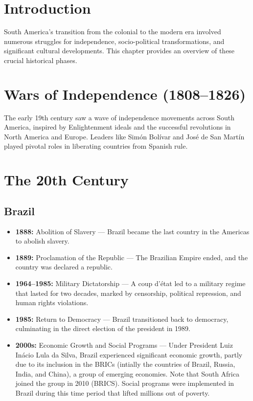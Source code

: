 \documentclass{book}
\begin{document}
\section{Introduction}
\label{sec:introduction-modern-south-america}
South America's transition from the colonial to the modern era involved numerous struggles for independence, socio-political transformations, and significant cultural developments. This chapter provides an overview of these crucial historical phases.

\section{Wars of Independence (1808–1826)}
\label{sec:wars-of-independence}
The early 19th century saw a wave of independence movements across South America, inspired by Enlightenment ideals and the successful revolutions in North America and Europe. Leaders like Simón Bolívar and José de San Martín played pivotal roles in liberating countries from Spanish rule.

\section{The 20th Century}
\label{sec:20th-century}

\subsection{Brazil}
\label{subsec:brazil}
\begin{itemize}
    \item \textbf{1888:} Abolition of Slavery — Brazil became the last country in the Americas to abolish slavery.
    \item \textbf{1889:} Proclamation of the Republic — The Brazilian Empire ended, and the country was declared a republic.
    \item \textbf{1964–1985:} Military Dictatorship — A coup d'état led to a military regime that lasted for two decades, marked by censorship, political repression, and human rights violations.
    \item \textbf{1985:} Return to Democracy — Brazil transitioned back to democracy, culminating in the direct election of the president in 1989.
    \item \textbf{2000s:} Economic Growth and Social Programs — Under President Luiz Inácio Lula da Silva, Brazil experienced significant economic growth, partly due to its inclusion in the BRICs (intially the countries of Brazil, Russia, India, and China), a group of emerging economies. Note that South Africa joined the group in 2010 (BRICS). Social programs were implemented in Brazil during this time period that lifted millions out of poverty.
\end{itemize}
\end{document}
